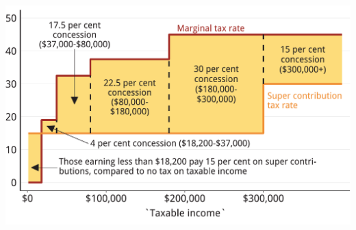 \documentclass[tikz]{standalone}\usepackage[]{graphicx}\usepackage[]{color}
\newenvironment{knitrout}{}{} %
\begin{document}
\begin{knitrout}
\color{fgcolor}
\includegraphics[width=11.000in,height=7.00in]{./Super-tax-targeting/b5-super-atlas/Figure4-2-1} 

\end{knitrout}
\end{document}
